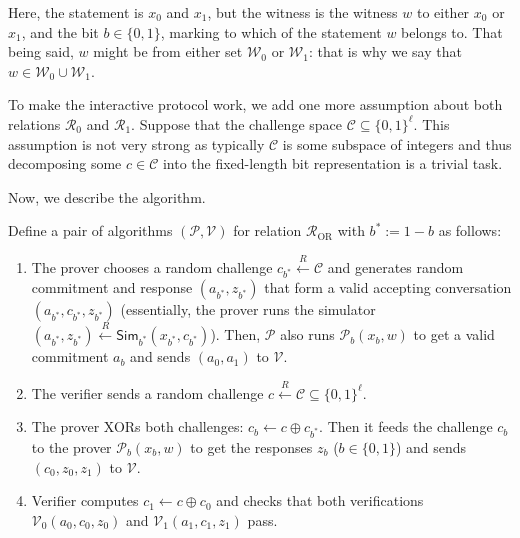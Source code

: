 \documentclass[../lecture-notes.tex]{subfiles}
\begin{document}
Here, the statement is $x_0$ and $x_1$, but the witness is the witness $w$ to either $x_0$ or $x_1$, and the bit $b \in \{0,1\}$, marking to which of the statement $w$ belongs to. That being said, $w$ might be from either set $\mathcal{W}_0$ or $\mathcal{W}_1$: that is why we say that $w \in \mathcal{W}_0 \cup \mathcal{W}_1$.

To make the interactive protocol work, we add one more assumption about both relations $\mathcal{R}_0$ and $\mathcal{R}_1$. Suppose that the challenge space $\mathcal{C} \subseteq \{0,1\}^{\ell}$. This assumption is not very strong as typically $\mathcal{C}$ is some subspace of integers and thus decomposing some $c \in \mathcal{C}$ into the fixed-length bit representation is a trivial task.

Now, we describe the algorithm.

\begin{definition}
    Define a pair of algorithms $(\mathcal{P},\mathcal{V})$ for relation $\mathcal{R}_{\text{OR}}$ with $b^* := 1-b$ as follows:
    \begin{enumerate}
        \item The prover chooses a random challenge $c_{b^*} \xleftarrow{R} \mathcal{C}$ and generates random commitment and response $(a_{b^*}, z_{b^*})$ that form a valid accepting conversation $(a_{b^*}, c_{b^*}, z_{b^*})$ (essentially, the prover runs the simulator $(a_{b^*}, z_{b^*}) \xleftarrow{R} \mathsf{Sim}_{b^*}(x_{b^*}, c_{b^*})$). Then, $\mathcal{P}$ also runs $\mathcal{P}_b(x_b, w)$ to get a valid commitment $a_b$ and sends $(a_0,a_1)$ to $\mathcal{V}$.
        \item The verifier sends a random challenge $c \xleftarrow{R} \mathcal{C} \subseteq \{0,1\}^{\ell}$.
        \item The prover XORs both challenges: $c_b \gets c \oplus c_{b^*}$. Then it feeds the challenge $c_b$ to the prover $\mathcal{P}_b(x_b,w)$ to get the responses $z_b$ ($b \in \{0,1\}$) and sends $(c_0,z_0,z_1)$ to $\mathcal{V}$.
        \item Verifier computes $c_1 \gets c \oplus c_0$ and checks that both verifications $\mathcal{V}_0(a_0,c_0,z_0)$ and $\mathcal{V}_1(a_1,c_1,z_1)$ pass.
    \end{enumerate}
\end{definition}
\end{document}

